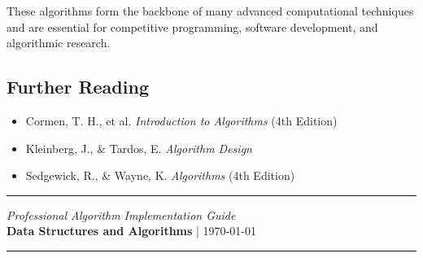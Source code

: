 \documentclass[12pt,a4paper]{article}
\begin{document}
These algorithms form the backbone of many advanced computational techniques and are essential for competitive programming, software development, and algorithmic research.

\subsection{Further Reading}

\begin{itemize}
    \item Cormen, T. H., et al. \textit{Introduction to Algorithms} (4th Edition)
    \item Kleinberg, J., \& Tardos, E. \textit{Algorithm Design}
    \item Sedgewick, R., \& Wayne, K. \textit{Algorithms} (4th Edition)
\end{itemize}

\vfill
\begin{center}
\rule{\textwidth}{1pt}
\vspace{0.5em}
\textit{Professional Algorithm Implementation Guide}\\
\textbf{Data Structures and Algorithms} | \today
\vspace{0.5em}
\rule{\textwidth}{1pt}
\end{center}
\end{document}

